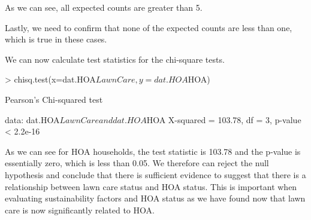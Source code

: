 \documentclass{article}
\begin{document}
As we can see, all expected counts are greater than 5.

Lastly, we need to confirm that none of the expected counts are less than one, which is true in these cases. 

We can now calculate test statistics for the chi-square tests. 
\begin{Schunk}
\begin{Sinput}
> chisq.test(x=dat.HOA$LawnCare,y=dat.HOA$HOA)
\end{Sinput}
\begin{Soutput}
	Pearson's Chi-squared test

data:  dat.HOA$LawnCare and dat.HOA$HOA
X-squared = 103.78, df = 3, p-value < 2.2e-16
\end{Soutput}
\end{Schunk}

As we can see for HOA households, the test statistic is 103.78 and the p-value is essentially zero, which is less than 0.05. We therefore can reject the null hypothesis and conclude that there is sufficient evidence to suggest that there is a relationship between lawn care status and HOA status. This is important when evaluating sustainability factors and HOA status as we have found now that lawn care is now significantly related to HOA.
\end{document}
